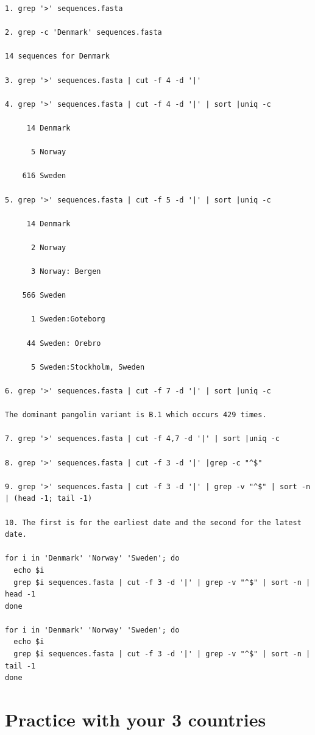 \documentclass[
]{book}
\begin{document}
\begin{verbatim}
1. grep '>' sequences.fasta

2. grep -c 'Denmark' sequences.fasta

14 sequences for Denmark

3. grep '>' sequences.fasta | cut -f 4 -d '|'

4. grep '>' sequences.fasta | cut -f 4 -d '|' | sort |uniq -c

     14 Denmark
     
      5 Norway
      
    616 Sweden

5. grep '>' sequences.fasta | cut -f 5 -d '|' | sort |uniq -c

     14 Denmark
     
      2 Norway
      
      3 Norway: Bergen
      
    566 Sweden
    
      1 Sweden:Goteborg
      
     44 Sweden: Orebro
     
      5 Sweden:Stockholm, Sweden

6. grep '>' sequences.fasta | cut -f 7 -d '|' | sort |uniq -c

The dominant pangolin variant is B.1 which occurs 429 times.

7. grep '>' sequences.fasta | cut -f 4,7 -d '|' | sort |uniq -c

8. grep '>' sequences.fasta | cut -f 3 -d '|' |grep -c "^$"

9. grep '>' sequences.fasta | cut -f 3 -d '|' | grep -v "^$" | sort -n | (head -1; tail -1)

10. The first is for the earliest date and the second for the latest date.

for i in 'Denmark' 'Norway' 'Sweden'; do
  echo $i
  grep $i sequences.fasta | cut -f 3 -d '|' | grep -v "^$" | sort -n | head -1
done

for i in 'Denmark' 'Norway' 'Sweden'; do
  echo $i
  grep $i sequences.fasta | cut -f 3 -d '|' | grep -v "^$" | sort -n | tail -1
done
\end{verbatim}

\hypertarget{practice-with-your-3-countries-1}{%
\section{Practice with your 3 countries}\label{practice-with-your-3-countries-1}}
\end{document}
